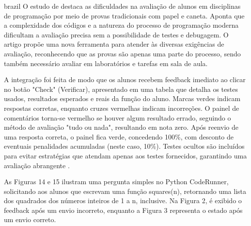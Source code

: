 \begin{otherlanguage*}{brazil}
O estudo de \textcite{lobbharlow} destaca as dificuldades na avaliação de alunos em disciplinas de programação por meio de provas tradicionais com papel e caneta. Aponta que a complexidade dos códigos e a natureza do processo de programação moderna dificultam a avaliação precisa sem a possibilidade de testes e debugagem. O artigo propõe uma nova ferramenta para atender às diversas exigências de avaliação, reconhecendo que as provas são apenas uma parte do processo, sendo também necessário avaliar em laboratórios e tarefas em sala de aula.

A integração foi feita de modo que os alunos recebem feedback imediato ao clicar no botão "Check" (Verificar), apresentado em uma tabela que detalha os testes usados, resultados esperados e reais da função do aluno. Marcas verdes indicam respostas corretas, enquanto cruzes vermelhas indicam incorreções. O painel de comentários torna-se vermelho se houver algum resultado errado, seguindo o método de avaliação "tudo ou nada", resultando em nota zero. Após reenvio de uma resposta correta, o painel fica verde, concedendo 100\%, com desconto de eventuais penalidades acumuladas (neste caso, 10\%). Testes ocultos são incluídos para evitar estratégias que atendam apenas aos testes fornecidos, garantindo uma avaliação abrangente \cite[p.~48]{lobbharlow}. 

As Figuras 14 e 15 ilustram uma pergunta simples no Python CodeRunner, solicitando aos alunos que escrevam uma função squares(n), retornando uma lista dos quadrados dos números inteiros de 1 a n, inclusive. Na Figura 2, é exibido o feedback após um envio incorreto, enquanto a Figura 3 representa o estado após um envio correto.


\end{otherlanguage*}
